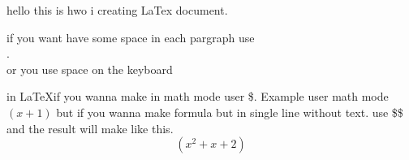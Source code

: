 \documentclass[12pt]{article}
\begin{document}
	hello this is hwo i creating LaTex document.
	
	if you want have some space in each pargraph use \\. \\
	
	or you use space on the keyboard
	
	in \LaTeX if you wanna make in math mode user \$. Example user math mode 
	$(x+1)$
	but if you wanna make formula but in single line without text. use \$\$ and the result will make like this. $$(x^2+x+2)$$
\end{document}
